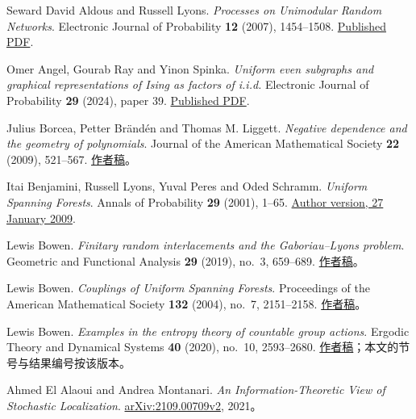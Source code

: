 \documentclass[UTF8,zihao=-4,a4paper]{ctexart}
\numberwithin{equation}{section}
\begin{document}
\clearpage
{}
{}\label{sec:references}
\begin{thebibliography}{Seward}
\small
\linespread{1.0}\selectfont
\setlength{\parskip}{0pt}
\setlength{\itemsep}{1pt}
 David Aldous and Russell Lyons. \emph{Processes on Unimodular Random Networks}. Electronic Journal of Probability \textbf{12} (2007), 1454--1508. \href{https://www.maths.tcd.ie/EMIS/journals/EJP-ECP/article/download/463/463-1495-1-PB.pdf}{Published PDF}.

 Omer Angel, Gourab Ray and Yinon Spinka. \emph{Uniform even subgraphs and graphical representations of Ising as factors of i.i.d.} Electronic Journal of Probability \textbf{29} (2024), paper 39. \href{https://dspace.library.uvic.ca/server/api/core/bitstreams/ec346c4f-76f7-4bb3-b54e-b95505de66de/content}{Published PDF}.

 Julius Borcea, Petter Brändén and Thomas M. Liggett. \emph{Negative dependence and the geometry of polynomials}. Journal of the American Mathematical Society \textbf{22} (2009), 521--567. \href{https://arxiv.org/pdf/0707.2340v2}{作者稿}。

 Itai Benjamini, Russell Lyons, Yuval Peres and Oded Schramm. \emph{Uniform Spanning Forests}. Annals of Probability \textbf{29} (2001), 1--65. \href{https://rdlyons.pages.iu.edu/pdf/usf.pdf}{Author version, 27 January 2009}.

 Lewis Bowen. \emph{Finitary random interlacements and the Gaboriau--Lyons problem}. Geometric and Functional Analysis \textbf{29} (2019), no.~3, 659--689. \href{https://arxiv.org/pdf/1707.09573v4}{作者稿}。

 Lewis Bowen. \emph{Couplings of Uniform Spanning Forests}. Proceedings of the American Mathematical Society \textbf{132} (2004), no.~7, 2151--2158. \href{https://arxiv.org/pdf/math/0301291v2}{作者稿}。

 Lewis Bowen. \emph{Examples in the entropy theory of countable group actions}. Ergodic Theory and Dynamical Systems \textbf{40} (2020), no.~10, 2593--2680. \href{https://arxiv.org/pdf/1704.06349v3}{作者稿}；本文的节号与结果编号按该版本。

 Ahmed El Alaoui and Andrea Montanari. \emph{An Information-Theoretic View of Stochastic Localization}. \href{https://arxiv.org/pdf/2109.00709v2}{arXiv:2109.00709v2}, 2021。


\end{thebibliography}
\end{document}
